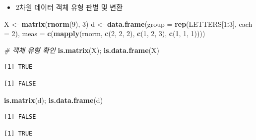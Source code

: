 \documentclass[
  11pt,
]{krantz}
\newenvironment{Shaded}{\begin{snugshade}}{\end{snugshade}}
\newcommand{\CommentTok}[1]{\textcolor[rgb]{0.37,0.37,0.37}{\textit{#1}}}
\newcommand{\DataTypeTok}[1]{\textcolor[rgb]{0.27,0.27,0.27}{#1}}
\newcommand{\DecValTok}[1]{\textcolor[rgb]{0.06,0.06,0.06}{#1}}
\newcommand{\KeywordTok}[1]{\textcolor[rgb]{0.27,0.27,0.27}{\textbf{#1}}}
\newcommand{\NormalTok}[1]{#1}
\newcommand{\OperatorTok}[1]{\textcolor[rgb]{0.43,0.43,0.43}{\textbf{#1}}}
\newcommand{\StringTok}[1]{\textcolor[rgb]{0.5,0.5,0.5}{#1}}
\providecommand{\tightlist}{%
  \setlength{\itemsep}{0pt}\setlength{\parskip}{0pt}}
\begin{document}
\normalsize

\begin{itemize}
\tightlist
\item
  2차원 데이터 객체 유형 판별 및 변환
\end{itemize}

\footnotesize

\begin{Shaded}
\begin{Highlighting}[]
\NormalTok{X <-}\StringTok{ }\KeywordTok{matrix}\NormalTok{(}\KeywordTok{rnorm}\NormalTok{(}\DecValTok{9}\NormalTok{), }\DecValTok{3}\NormalTok{)}
\NormalTok{d <-}\StringTok{ }\KeywordTok{data.frame}\NormalTok{(}\DataTypeTok{group =} \KeywordTok{rep}\NormalTok{(LETTERS[}\DecValTok{1}\OperatorTok{:}\DecValTok{3}\NormalTok{], }\DataTypeTok{each =} \DecValTok{2}\NormalTok{), }
                \DataTypeTok{meas =} \KeywordTok{c}\NormalTok{(}\KeywordTok{mapply}\NormalTok{(rnorm, }
                                \KeywordTok{c}\NormalTok{(}\DecValTok{2}\NormalTok{, }\DecValTok{2}\NormalTok{, }\DecValTok{2}\NormalTok{),}
                                \KeywordTok{c}\NormalTok{(}\DecValTok{1}\NormalTok{, }\DecValTok{2}\NormalTok{, }\DecValTok{3}\NormalTok{), }
                                \KeywordTok{c}\NormalTok{(}\DecValTok{1}\NormalTok{, }\DecValTok{1}\NormalTok{, }\DecValTok{1}\NormalTok{))))}

\CommentTok{# 객체 유형 확인}
\KeywordTok{is.matrix}\NormalTok{(X); }\KeywordTok{is.data.frame}\NormalTok{(X)}
\end{Highlighting}
\end{Shaded}

\begin{verbatim}
[1] TRUE
\end{verbatim}

\begin{verbatim}
[1] FALSE
\end{verbatim}

\begin{Shaded}
\begin{Highlighting}[]
\KeywordTok{is.matrix}\NormalTok{(d); }\KeywordTok{is.data.frame}\NormalTok{(d)}
\end{Highlighting}
\end{Shaded}

\begin{verbatim}
[1] FALSE
\end{verbatim}

\begin{verbatim}
[1] TRUE
\end{verbatim}
\end{document}
